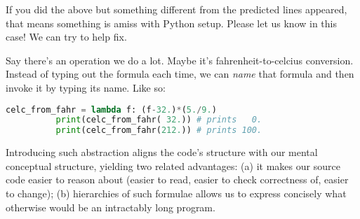        If you did the above but something different from the predicted lines
        appeared, that means something is amiss with Python setup.  Please let
        us know in this case!  We can try to help fix.






        Say there's an operation we do a lot.  Maybe it's fahrenheit-to-celcius
        conversion.  Instead of typing out the formula each time, we can
        \emph{name} that formula and then invoke it by typing its name.  Like
        so:
        \begin{lstlisting}[language=Python, basicstyle=\footnotesize\ttfamily]
          celc_from_fahr = lambda f: (f-32.)*(5./9.)
          print(celc_from_fahr( 32.)) # prints   0.
          print(celc_from_fahr(212.)) # prints 100.
        \end{lstlisting}
        Introducing such abstraction aligns the code's structure with our
        mental conceptual structure, yielding two related advantages:
        (a) it makes our source code easier to reason about (easier to read,
        easier to check correctness of, easier to change);
        (b) hierarchies of such formulae allows us to express concisely what
        otherwise would be an intractably long program.

